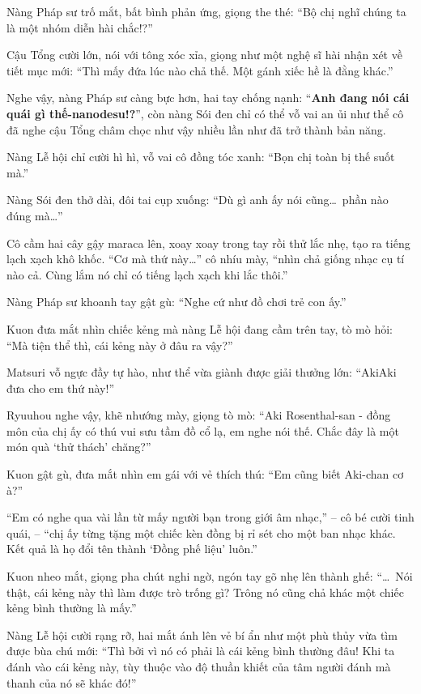 \documentclass[../main.tex]{subfiles}
\begin{document}

Nàng Pháp sư trố mắt, bất bình phản ứng, giọng the thé: ``Bộ chị nghĩ chúng ta là một nhóm diễn hài chắc!?''

Cậu Tổng cười lớn, nói với tông xóc xỉa, giọng như một nghệ sĩ hài nhận xét về tiết mục mới: ``Thì mấy đứa lúc nào chả thế. Một gánh xiếc hề là đằng khác.''

Nghe vậy, nàng Pháp sư càng bực hơn, hai tay chống nạnh: ``\textbf{Anh đang nói cái quái gì thế-nanodesu!?}'', còn nàng Sói đen chỉ có thể vỗ vai an ủi như thể cô đã nghe cậu Tổng châm chọc như vậy nhiều lần như đã trở thành bản năng.

Nàng Lễ hội chỉ cười hì hì, vỗ vai cô đồng tóc xanh: ``Bọn chị toàn bị thế suốt mà.''

Nàng Sói đen thở dài, đôi tai cụp xuống: ``Dù gì anh ấy nói cũng\dots\ phần nào đúng mà\dots''

Cô cầm hai cây gậy maraca lên, xoay xoay trong tay rồi thử lắc nhẹ, tạo ra tiếng lạch xạch khô khốc. ``Cơ mà thứ này\dots'' cô nhíu mày, ``nhìn chả giống nhạc cụ tí nào cả. Cùng lắm nó chỉ có tiếng lạch xạch khi lắc thôi.''

Nàng Pháp sư khoanh tay gật gù: ``Nghe cứ như đồ chơi trẻ con ấy.''

Kuon đưa mắt nhìn chiếc kẻng mà nàng Lễ hội đang cầm trên tay, tò mò hỏi: ``Mà tiện thể thì, cái kẻng này ở đâu ra vậy?''

Matsuri vỗ ngực đầy tự hào, như thể vừa giành được giải thưởng lớn: ``AkiAki đưa cho em thứ này!''

Ryuuhou nghe vậy, khẽ nhướng mày, giọng tò mò: ``Aki Rosenthal-san - đồng môn của chị ấy có thú vui sưu tầm đồ cổ lạ, em nghe nói thế. Chắc đây là một món quà `thử thách' chăng?''

Kuon gật gù, đưa mắt nhìn em gái với vẻ thích thú: ``Em cũng biết Aki-chan cơ à?''

``Em có nghe qua vài lần từ mấy người bạn trong giới âm nhạc,'' – cô bé cười tinh quái, – ``chị ấy từng tặng một chiếc kèn đồng bị rỉ sét cho một ban nhạc khác. Kết quả là họ đổi tên thành `Đồng phế liệu' luôn.''

Kuon nheo mắt, giọng pha chút nghi ngờ, ngón tay gõ nhẹ lên thành ghế: ``\dots\ Nói thật, cái kẻng này thì làm được trò trống gì? Trông nó cũng chả khác một chiếc kẻng bình thường là mấy.''

Nàng Lễ hội cười rạng rỡ, hai mắt ánh lên vẻ bí ẩn như một phù thủy vừa tìm được bùa chú mới: ``Thì bởi vì nó có phải là cái kẻng bình thường đâu! Khi ta đánh vào cái kẻng này, tùy thuộc vào độ thuần khiết của tâm người đánh mà thanh của nó sẽ khác đó!''
\end{document}
